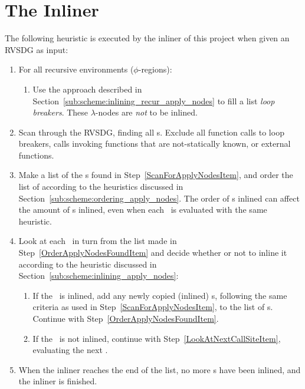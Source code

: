 
\clearpage
\section{The Inliner}
\label{sec:scheme}

The following heuristic is executed by the inliner of this project when given an
RVSDG as input:

\begin{enumerate}
	\item For all recursive environments ($\phi$-regions):

	\begin{enumerate}
		\item Use the approach described in
Section~\ref{sub:scheme:inlining_recur_apply_nodes} to fill a list \textit{loop
breakers}. These $\lambda$-nodes are \textit{not} to be inlined.
		\label{MakeLoopBreakerListItem}
	\end{enumerate}

	\item Scan through the RVSDG, finding all \applyNode s. Exclude all function
calls to loop breakers, calls invoking functions that are not-statically known,
or external functions.
	\label{ScanForApplyNodesItem}

	\item Make a list of the \applyNode s found in
Step~\ref{ScanForApplyNodesItem}, and order the list of according to the
heuristics discussed in Section~\ref{sub:scheme:ordering_apply_nodes}.
The order of \applyNode s inlined can affect the amount of \applyNode s inlined,
even when each \applyNode~is evaluated with the same heuristic.
	\label{OrderApplyNodesFoundItem}

	\item Look at each \applyNode~in turn from the list made in
Step~\ref{OrderApplyNodesFoundItem} and decide whether or not to inline it
according to the heuristic discussed in
Section~\ref{sub:scheme:inlining_apply_nodes}:
	\label{LookAtNextCallSiteItem}

	\begin{enumerate}
		\item If the \applyNode~is inlined, add any newly copied (inlined)
\applyNode s, following the same criteria as used in
Step~\ref{ScanForApplyNodesItem}, to the list of \applyNode s. Continue with
Step~\ref{OrderApplyNodesFoundItem}.

		\item If the \applyNode~is not inlined, continue with
Step~\ref{LookAtNextCallSiteItem}, evaluating the next \applyNode .
		\label{InlineCallSiteItem}
	\end{enumerate}

	\item When the inliner reaches the end of the list, no more \applyNode s
have been inlined, and the inliner is finished.
\end{enumerate}

